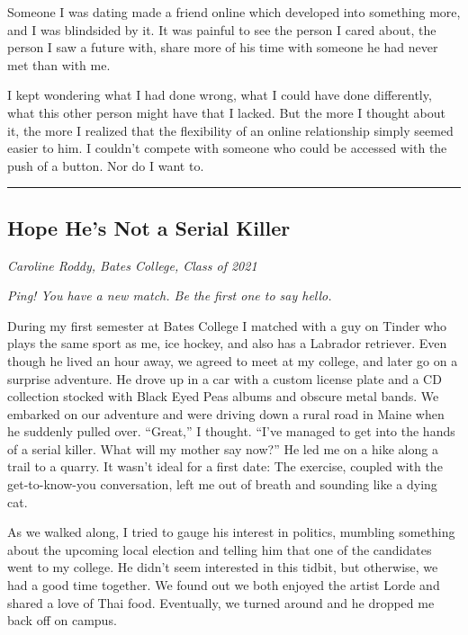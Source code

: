 Someone I was dating made a friend online which developed into something
more, and I was blindsided by it. It was painful to see the person I
cared about, the person I saw a future with, share more of his time with
someone he had never met than with me.

I kept wondering what I had done wrong, what I could have done
differently, what this other person might have that I lacked. But the
more I thought about it, the more I realized that the flexibility of an
online relationship simply seemed easier to him. I couldn't compete with
someone who could be accessed with the push of a button. Nor do I want
to.

\begin{center}\rule{0.5\linewidth}{\linethickness}\end{center}

\hypertarget{hope-hes-not-a-serial-killer}{%
\subsection{Hope He's Not a Serial
Killer}\label{hope-hes-not-a-serial-killer}}

\emph{Caroline Roddy, Bates College, Class of 2021}

\emph{Ping! You have a new match. Be the first one to say hello.}

During my first semester at Bates College I matched with a guy on Tinder
who plays the same sport as me, ice hockey, and also has a Labrador
retriever. Even though he lived an hour away, we agreed to meet at my
college, and later go on a surprise adventure. He drove up in a car with
a custom license plate and a CD collection stocked with Black Eyed Peas
albums and obscure metal bands. We embarked on our adventure and were
driving down a rural road in Maine when he suddenly pulled over.
``Great,'' I thought. ``I've managed to get into the hands of a serial
killer. What will my mother say now?'' He led me on a hike along a trail
to a quarry. It wasn't ideal for a first date: The exercise, coupled
with the get-to-know-you conversation, left me out of breath and
sounding like a dying cat.

As we walked along, I tried to gauge his interest in politics, mumbling
something about the upcoming local election and telling him that one of
the candidates went to my college. He didn't seem interested in this
tidbit, but otherwise, we had a good time together. We found out we both
enjoyed the artist Lorde and shared a love of Thai food. Eventually, we
turned around and he dropped me back off on campus.

